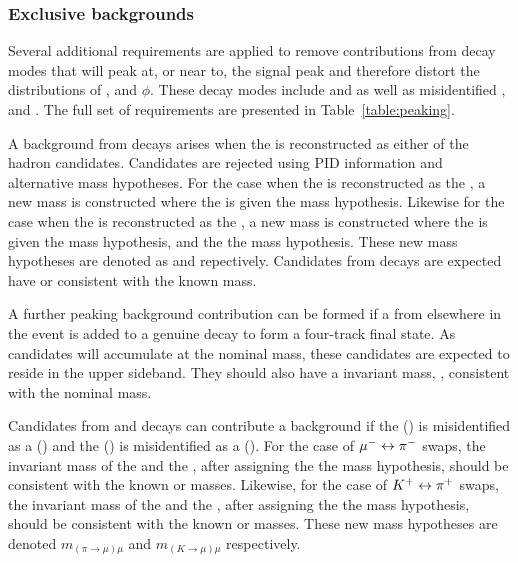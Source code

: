 \subsubsection{Exclusive backgrounds}

Several additional requirements are applied to remove contributions from decay modes that will peak at, or near to, the signal peak and therefore distort the distributions of \ctl, \ctk and $\phi$. These decay modes include \LbTopKmm and \BuToKmm as well as misidentified \BdToJPsiKpi, \BdToPsitwosKpi and \BdToKpimm. The full set of requirements are presented in Table~\ref{table:peaking}.

A background from \LbTopKmm decays arises when the \proton is reconstructed as either of the hadron candidates. Candidates are rejected using PID information and alternative mass hypotheses. For the case when the \proton is reconstructed as the \pion, a new mass is constructed where the \pion is given the \proton mass hypothesis. Likewise for the case when the \proton is reconstructed as the \kaon, a new mass is constructed where the \kaon is given the \proton mass hypothesis, and the \pion the \kaon mass hypothesis. These new mass hypotheses are denoted as \mSwappKmm and \mDoubleSwappKmm repectively. Candidates from \LbTopKmm decays are expected have \mSwappKmm or \mDoubleSwappKmm consistent with the known \Lb mass.

A further peaking background contribution can be formed if a \pim from elsewhere in the event is added to a genuine \BuToKmm decay to form a four-track final state.  As \BuToKmm candidates will accumulate at the nominal \Bz mass, these candidates are expected to reside in the upper \mkpimm sideband. They should also have a \Kp\mumu invariant mass, \mkmm, consistent with the nominal \Bz mass. 

Candidates from \BdToJPsiKpi and  \BdToPsitwosKpi decays can contribute a background if the \pim (\Kp) is misidentified as a \mun (\mup) and the \mun (\mup) is misidentified as a \pim (\Kp).  For the case of ${\mu^-} \leftrightarrow {\ensuremath{{\pi}^-}}$ swaps, the invariant mass of the \pim and the \mup, after assigning the \pim the \muon mass hypothesis, should be consistent with the known \jpsi or \psitwos masses.  Likewise, for the case of ${{K}^+} \leftrightarrow {\ensuremath{{\pi}^+}}$ swaps, the invariant mass of the \Kp and the \mun, after assigning the \Kp the \muon mass hypothesis, should be consistent with the known \jpsi or \psitwos masses. These new mass hypotheses are denoted $m_{(\pi\to\mu)\mu}$ and $m_{(K\to\mu)\mu}$ respectively.

